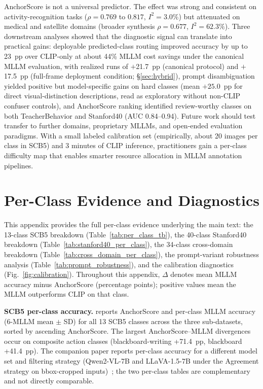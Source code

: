 \documentclass[a4paper,fleqn]{cas-sc}
\begin{document}
AnchorScore is not a universal predictor. The effect was strong and consistent on activity-recognition tasks ($\rho=0.769$ to $0.817$, $I^2=3.0\%$) but attenuated on medical and satellite domains (broader synthesis $\rho=0.677$, $I^2=62.3\%$). Three downstream analyses showed that the diagnostic signal can translate into practical gains: deployable predicted-class routing improved accuracy by up to 23~pp over CLIP-only at about 44\% MLLM cost savings under the canonical MLLM evaluation, with realized runs of $+$21.7~pp (canonical protocol) and $+$17.5~pp (full-frame deployment condition; \S\ref{sec:hybrid}), prompt disambiguation yielded positive but model-specific gains on hard classes (mean $+25.0$~pp for direct visual-distinction descriptions, read as exploratory without non-CLIP confuser controls), and AnchorScore ranking identified review-worthy classes on both TeacherBehavior and Stanford40 (AUC 0.84--0.94). Future work should test transfer to further domains, proprietary MLLMs, and open-ended evaluation paradigms. With a small labeled calibration set (empirically, about 20 images per class in SCB5) and 3 minutes of CLIP inference, practitioners gain a per-class difficulty map that enables smarter resource allocation in MLLM annotation pipelines.



\appendix
\setcounter{figure}{0}
\renewcommand{\thefigure}{A\arabic{figure}}
\setcounter{table}{0}
\renewcommand{\thetable}{A\arabic{table}}
\clearpage
\section{Per-Class Evidence and Diagnostics}
\label{app:materials}

This appendix provides the full per-class evidence underlying the main text: the 13-class SCB5 breakdown (Table~\ref{tab:per_class_tb}), the 40-class Stanford40 breakdown (Table~\ref{tab:stanford40_per_class}), the 34-class cross-domain breakdown (Table~\ref{tab:cross_domain_per_class}), the prompt-variant robustness analysis (Table~\ref{tab:prompt_robustness}), and the calibration diagnostics (Fig.~\ref{fig:calibration}). Throughout this appendix, $\Delta$ denotes mean MLLM accuracy minus AnchorScore (percentage points); positive values mean the MLLM outperforms CLIP on that class.

\textbf{SCB5 per-class accuracy.}  reports AnchorScore and per-class MLLM accuracy (6-MLLM mean $\pm$ SD) for all 13 SCB5 classes across the three sub-datasets, sorted by ascending AnchorScore. The largest AnchorScore--MLLM divergences occur on composite action classes (blackboard-writing +71.4~pp, blackboard +41.4~pp). The companion paper reports per-class accuracy for a different model set and filtering strategy (Qwen2-VL-7B and LLaVA-1.5-7B under the Agreement strategy on bbox-cropped inputs)~\cite{ma2026agreement}; the two per-class tables are complementary and not directly comparable.
\end{document}
